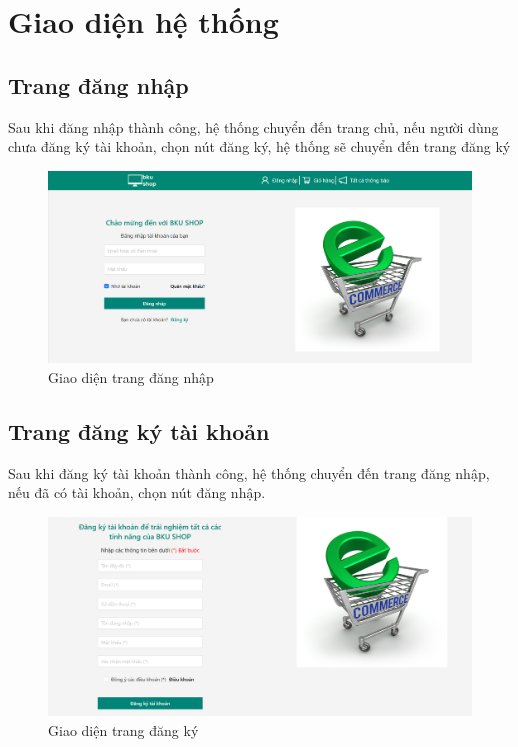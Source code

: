 \section{Giao diện hệ thống}
\subsection{Trang đăng nhập}
\noindent Sau khi đăng nhập thành công, hệ thống chuyển đến trang chủ, nếu người dùng chưa đăng ký tài khoản, chọn nút đăng ký, hệ thống sẽ chuyển đến trang đăng ký
\begin{figure}[H]
    \begin{center}
    \includegraphics[scale=0.35]{images/hieu/chap-5/login.png}
    \vspace*{3mm}
    \caption{Giao diện trang đăng nhập}
    \end{center}
\end{figure}

\subsection{Trang đăng ký tài khoản}
\noindent Sau khi đăng ký tài khoản thành công, hệ thống chuyển đến trang đăng nhập, nếu đã có tài khoản, chọn nút đăng nhập.
\begin{figure}[H]
    \begin{center}
    \includegraphics[scale=0.35]{images/hieu/chap-5/signup.png}
    \vspace*{3mm}
    \caption{Giao diện trang đăng ký}
    \end{center}
\end{figure}
